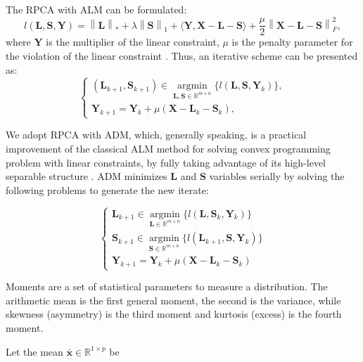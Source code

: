 The RPCA with ALM can be formulated:
\begin{equation}\label{eq:4.04}
	l(\pmb{L}, \pmb{S}, \pmb{Y}) = \left\|\pmb{L}\right\|_* + \lambda\left\|\pmb{S}\right\|_1 + \langle \pmb{Y}, \pmb{X} - \pmb{L} - \pmb{S}  \rangle + \frac{\mu}{2}\left\|\pmb{X} - \pmb{L} - \pmb{S}\right\|_F^2,
\end{equation}
where $\pmb{Y}$ is the multiplier of the linear constraint, $\mu$ is the penalty parameter for the violation of the linear constraint \cite{yuan2009sparse}. Thus, an iterative scheme can be presented as:
\begin{equation}\label{eq:4.05}
	\left\{
		\begin{matrix} 
			(\pmb{L}_{k+1}, \pmb{S}_{k+1}) \in \operatorname*{argmin}_{\pmb{L,S} \in \mathbb{R}^{m \times n}} \{l(\pmb{L}, \pmb{S}, \pmb{Y}_{k})\}, \\ 
			\pmb{Y}_{k+1} = \pmb{Y}_{k} + \mu(\pmb{X} - \pmb{L}_{k} - \pmb{S}_{k}),
		\end{matrix}
	\right.
\end{equation}

We adopt RPCA with ADM, which, generally speaking, is a practical improvement of the classical ALM method for solving convex programming problem with linear constraints, by fully taking advantage of its high-level separable structure \cite{yuan2009sparse}. ADM minimizes $\pmb{L}$ and $\pmb{S}$ variables serially by solving the following problems to generate the new iterate:

\begin{equation}\label{eq:4.06}
	\left\{\begin{matrix}
	\pmb{L}_{k+1} \in \operatorname*{argmin}_{\pmb{L} \in \mathbb{R}^{m \times n}}\{l(\pmb{L}, \pmb{S}_{k}, \pmb{Y}_{k})\}\\ 
	\pmb{S}_{k+1} \in \operatorname*{argmin}_{\pmb{S} \in \mathbb{R}^{m \times n}}\{l(\pmb{L}_{k+1}, \pmb{S}, \pmb{Y}_{k})\}\\ 
	\pmb{Y}_{k+1} = \pmb{Y}_{k} + \mu(\pmb{X} - \pmb{L}_{k} - \pmb{S}_{k})
	\end{matrix}\right.
\end{equation}

Moments are a set of statistical parameters to measure a distribution. The arithmetic mean is the first general moment, the second is the variance, while skewness (asymmetry) is the third moment and kurtosis (excess) is the fourth moment.

Let the mean $\bar{\pmb{x}} \in \mathbb{R}^{1 \times p}$ be

